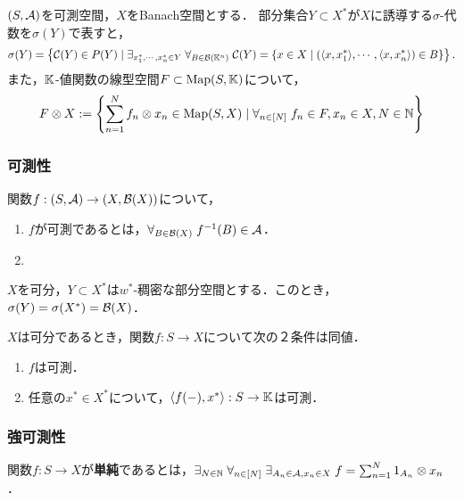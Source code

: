 \documentclass[uplatex,dvipdfmx]{jsreport}
\begin{document}
\begin{notation}
    $(S,\mathcal{A})$を可測空間，$X$をBanach空間とする．
    部分集合$Y\subset X^*$が$X$に誘導する$\sigma$-代数を$\sigma(Y)$で表すと，
    \[\sigma(Y)=\left\{\mathcal{C}(Y)\in P(Y)\mid\exists_{x_1^*,\cdots,x_n^*\in Y}\;\forall_{B\in\mathcal{B}(\mathbb{K}^n)}\;\mathcal{C}(Y)=\left\{x\in X\mid (\langle x,x_1^*\rangle,\cdots,\langle x,x_n^*\rangle)\in B\right\}\right\}.\]
    また，$\mathbb{K}$-値関数の線型空間$F\subset\mathrm{Map}(S,\mathbb{K})$について，
    \[F\otimes X:=\left\{\sum^N_{n=1}f_n\otimes x_n\in\mathrm{Map}(S,X)\mid\forall_{n\in[N]}\;f_n\in F,x_n\in X,N\in\mathbb{N}\right\}\]
\end{notation}

\subsubsection{可測性}

\begin{definition}[measurable]
    関数$f:(S,\mathcal{A})\to (X,\mathcal{B}(X))$について，
    \begin{enumerate}
        \item $f$が可測であるとは，$\forall_{B\in\mathcal{B}(X)}\;f^{-1}(B)\in\mathcal{A}$．
        \item 
    \end{enumerate}
\end{definition}

\begin{proposition}[可分ならば縮退する]
    $X$を可分，$Y\subset X^*$は$w^*$-稠密な部分空間とする．このとき，$\sigma(Y)=\sigma(X^*)=\mathcal{B}(X)$．
\end{proposition}

\begin{corollary}[可測性の特徴付け]
    $X$は可分であるとき，関数$f:S\to X$について次の２条件は同値．
    \begin{enumerate}
        \item $f$は可測．
        \item 任意の$x^*\in X^*$について，$\langle f(-),x^*\rangle:S\to\mathbb{K}$は可測．
    \end{enumerate}
\end{corollary}

\subsubsection{強可測性}

\begin{definition}[simple]
    関数$f:S\to X$が\textbf{単純}であるとは，$\exists_{N\in\mathbb{N}}\;\forall_{n\in[N]}\;\exists_{A_n\in\mathcal{A},x_n\in X}\;f=\sum_{n=1}^N1_{A_n}\otimes x_n$．
\end{definition}
\end{document}
